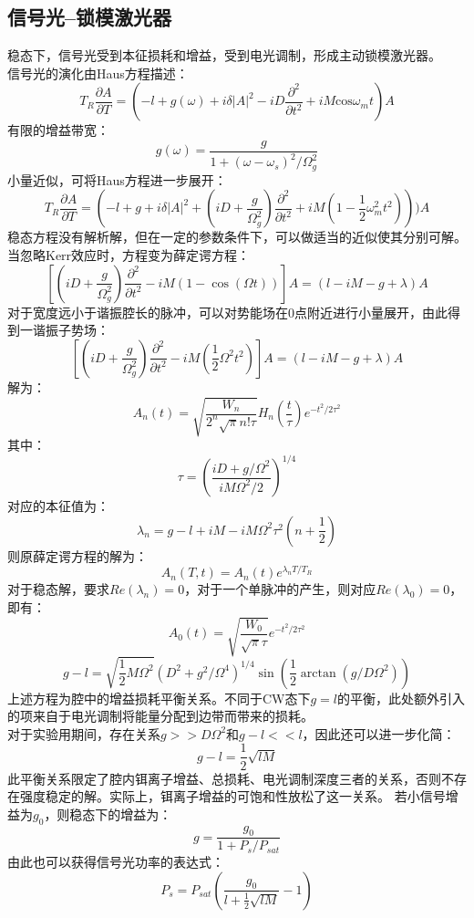 \subsection{信号光--锁模激光器}
稳态下，信号光受到本征损耗和增益，受到电光调制，形成主动锁模激光器。\\
信号光的演化由Haus方程描述：
\[T_R \frac{\partial A}{\partial T} = (-l + g(\omega) + i\delta |A|^2 - iD\frac{\partial^2}{\partial t^2} + iM\mathrm{cos}\omega_m t) A \]
有限的增益带宽：
\[g(\omega) = \frac{g}{1+(\omega - \omega_s)^2/\Omega_g^2}\]
小量近似，可将Haus方程进一步展开：
\[T_R \frac{\partial A}{\partial T} = (-l + g + i\delta |A|^2 + (iD + \frac{g}{\Omega_g^2})\frac{\partial^2}{\partial t^2} + iM(1 - \frac{1}{2} \omega_m^2 t^2))) A \]
稳态方程没有解析解，但在一定的参数条件下，可以做适当的近似使其分别可解。\\
当忽略Kerr效应时，方程变为薛定谔方程：\\
\[[(iD + \frac{g}{\Omega_g^2}) \frac{\partial^2}{\partial t^2} - iM(1 - \cos(\Omega t))] A = (l - iM - g + \lambda) A\]
对于宽度远小于谐振腔长的脉冲，可以对势能场在0点附近进行小量展开，由此得到一谐振子势场：\\
\[[(iD + \frac{g}{\Omega_g^2}) \frac{\partial^2}{\partial t^2} - iM(\frac{1}{2} \Omega^2 t^2)] A = (l - iM - g + \lambda) A\]
解为：\\
\[A_n(t) = \sqrt{\frac{W_n}{2^n \sqrt{\pi} n! \tau}} H_n(\frac{t}{\tau}) e^{-t^2 / 2\tau^2}\]
其中：\\
\[\tau = {(\frac{iD + g/\Omega^2}{iM\Omega^2/2})}^{1/4}\]
对应的本征值为：\\
\[\lambda_n = g - l + iM - iM\Omega^2 \tau^2 (n + \frac{1}{2})\]
则原薛定谔方程的解为：\\
\[A_n(T, t) = A_n(t) e^{\lambda_n T / T_R}\]
对于稳态解，要求$Re(\lambda_n) = 0$，对于一个单脉冲的产生，则对应$Re(\lambda_0) = 0$，即有：\\
\[A_0(t) = \sqrt{\frac{W_0}{\sqrt{\pi} \tau}} e^{-t^2 / 2\tau^2}\]
\[g - l = \sqrt{\frac{1}{2} M \Omega^2} {(D^2 + g^2 / \Omega^4)}^{1/4} \sin(\frac{1}{2} \arctan{(g / D\Omega^2)})\]
上述方程为腔中的增益损耗平衡关系。不同于CW态下$g = l$的平衡，此处额外引入的项来自于电光调制将能量分配到边带而带来的损耗。\\
对于实验用期间，存在关系$g >> D\Omega^2$和$g - l << l$，因此还可以进一步化简：\\
\[g - l = \frac{1}{2}\sqrt{l M} \]
此平衡关系限定了腔内铒离子增益、总损耗、电光调制深度三者的关系，否则不存在强度稳定的解。实际上，铒离子增益的可饱和性放松了这一关系。
若小信号增益为$g_0$，则稳态下的增益为：
\[g = \frac{g_0}{1 + P_s / P_{sat}}\]
由此也可以获得信号光功率的表达式：\\
\[P_s = P_{sat} (\frac{g_0}{l + \frac{1}{2} \sqrt{lM}} - 1)\]

